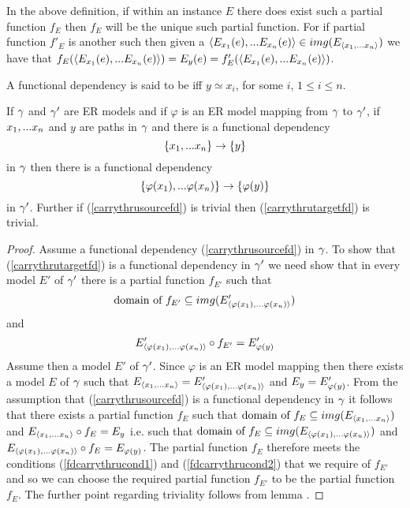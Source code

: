 \begin{remark}
In the above definition, if within an instance $E$ there does exist such a partial function $f_E$ then $f_E$ will be the unique such partial function. For if partial function $f'_E$ is another such then given a $\langle E_{x_1}(e),...E_{x_n}(e)\rangle \in img(E_{\langle x_1,...x_n\rangle})$
we have that $f_E(\langle E_{x_1}(e),...E_{x_n}(e)\rangle)=E_y(e)=f'_E(\langle E_{x_1}(e),...E_{x_n}(e)\rangle)$.
\end{remark}

\begin{definition}
A functional dependency  is said to be  iff $y\simeq x_i$, for some $i$, $1 \leq i \leq n$.
\end{definition}

\begin{lemma}
If $\gamma$ and $\gamma'$ are ER models and  if  $\varphi$ is an ER model mapping from $\gamma$  to $\gamma'$,  if $x_1,...x_n$ and $y$ are paths in $\gamma$
and there is a  functional dependency
\begin{equation}
\label{carrythrusourcefd}
\left\{x_1,...x_n\right\} \rightarrow \left\{y\right\}
\end{equation} 
in $\gamma$ then there is a functional dependency
\begin{equation}
\label{carrythrutargetfd}
\left\{\varphi(x_1),...\varphi(x_n)\right\} \rightarrow \left\{\varphi(y)\right\}
\end{equation}
in $\gamma'$.
Further if (\ref{carrythrusourcefd}) is trivial then (\ref{carrythrutargetfd}) is trivial.
\end{lemma}
\begin{proof}
Assume a functional dependency (\ref{carrythrusourcefd})  in $\gamma$. To show that (\ref{carrythrutargetfd}) is a functional dependency in $\gamma'$
we need show that in every model $E'$ 
of $\gamma'$ there is a partial function $f_{E'}$ such that
\begin{equation}
\label{fdcarrythrucond1}
\mbox{domain of }f_{E'} \subseteq img(E'_{\langle\varphi(x_1),...\varphi(x_n)\rangle})
\end{equation}
and
\begin{equation}
\label{fdcarrythrucond2}
E'_{\langle\varphi(x_1),...\varphi(x_n)\rangle} \circ f_{E'} = E'_{\varphi(y)}
\end{equation}
Assume then a model $E'$ of $\gamma'$. 
Since $\varphi$ is an ER model mapping then there exists a model $E$ of $\gamma$ such that 
$E_{\langle x_1,...x_n\rangle} = E'_{\langle\varphi(x_1),...\varphi(x_n)\rangle}$ and $E_y = E'_{\varphi(y)}$. From the assumption that (\ref{carrythrusourcefd})
is a functional dependency in $\gamma$ it follows that there exists a  partial function $f_E$ such that
$\mbox{domain of }f_{E} \subseteq img(E_{\langle x_1,...x_n\rangle})$
and
$E_{\langle x_1,...x_n\rangle} \circ f_{E} = E_y$ 
i.e. such that 
$\mbox{domain of }f_{E} \subseteq img(E_{\langle\varphi(x_1),...\varphi(x_n)\rangle})$
and
$E_{\langle\varphi(x_1),...\varphi(x_n)\rangle} \circ f_{E} = E_{\varphi(y)}$.  The partial function $f_E$ therefore 
meets the conditions (\ref{fdcarrythrucond1}) and (\ref{fdcarrythrucond2}) that
we require of $f_{E'}$ and so we can choose the required partial function
$f_{E'}$ to be the partial function $f_E$. 
The further point regarding triviality follows from lemma .
\end{proof}


